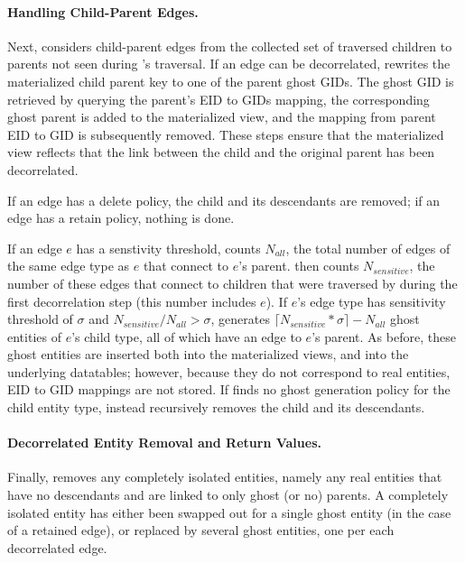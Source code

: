 \paragraph{Handling Child-Parent Edges.}
Next, \sys considers child-parent edges from the collected set of traversed children to parents
not seen during \sys's traversal. If an 
edge can be decorrelated, \sys rewrites the materialized child parent key to one of the parent
ghost GIDs. The ghost GID is retrieved by querying the parent's EID to GIDs mapping, the
corresponding ghost parent is added to the materialized view,
and the mapping from parent EID to GID is subsequently removed. These steps ensure that the
materialized view reflects that the link between the child and the original parent has been
decorrelated.

If an edge has a delete policy, the child and its descendants are removed; if an edge has a retain
policy, nothing is done. 
%

If an edge $e$ has a senstivity threshold,
\sys counts $N_{all}$, the total number of edges of the same edge type as $e$ that connect to $e$'s parent.
\sys then counts $N_{sensitive}$, the number of these edges that connect to children that were traversed by \sys during the
first decorrelation step (this number includes $e$).
If $e$'s edge type has sensitivity threshold of $\sigma$ and $N_{sensitive} / N_{all} > \sigma$,
\sys generates $\lceil N_{sensitive}*\sigma\rceil - N_{all}$ ghost entities of $e$'s child type, all
of which have an edge to $e$'s parent.
As before, these ghost entities are inserted both into the materialized views, and into the underlying
datatables; however, because they do not correspond to real entities, EID to GID mappings are not
stored. 
If \sys finds no ghost generation policy for the child entity type, \sys instead recursively
removes the child and its descendants.

\paragraph{Decorrelated Entity Removal and Return Values.}
Finally, \sys removes any completely isolated entities, namely any real entities that have no
descendants and are linked to only ghost (or no) parents. A completely isolated entity has either been swapped
out for a single ghost entity (in the case of a retained edge), or replaced by several ghost
entities, one per each decorrelated edge.


